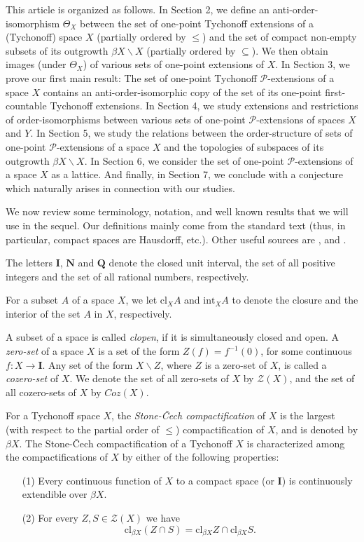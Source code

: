 \documentclass{amsart}
\theoremstyle{definition}
\theoremstyle{remark}
\theoremstyle{notation}
\numberwithin{equation}{section}
\begin{document}
This article is organized as follows. In Section 2, we define an anti-order-isomorphism $\Theta_X$ between the set of  one-point Tychonoff extensions of a (Tychonoff) space $X$ (partially ordered by $\leq$) and the set of compact non-empty subsets of its outgrowth $\beta X\backslash X$ (partially ordered by $\subseteq$). We then obtain images (under  $\Theta_X$) of various sets of one-point  extensions of $X$. In Section 3, we prove our first main  result: The set of one-point Tychonoff ${\mathcal P}$-extensions of a space $X$ contains an anti-order-isomorphic copy  of the set of its one-point first-countable Tychonoff extensions. In  Section 4, we study extensions and restrictions of order-isomorphisms between various sets of one-point ${\mathcal P}$-extensions of spaces $X$ and $Y$. In  Section 5, we study the relations between the order-structure of sets of one-point  ${\mathcal P}$-extensions of a space  $X$ and the topologies of subspaces of its outgrowth $\beta X\backslash X$. In Section 6, we consider the set of one-point  ${\mathcal P}$-extensions of a space $X$ as a lattice. And finally, in  Section 7, we  conclude  with  a conjecture which naturally arises in connection with our studies.

We now review some terminology, notation, and well known results that we will  use in the sequel. Our definitions mainly  come from the standard  text \cite{E} (thus, in particular, compact spaces are Hausdorff,  etc.). Other useful sources are \cite{GJ}, \cite{PW} and \cite{W}.

The letters $\mathbf{I}$,  $\mathbf{N}$ and $\mathbf{Q}$ denote the closed unit interval,  the set of all positive integers and the set of all rational numbers, respectively.

For a subset $A$ of a space $X$, we let $\mbox{cl}_X A$ and $\mbox{int}_X A$ to denote the closure and the interior  of the set $A$ in $X$, respectively.

A subset of a space is called {\em clopen}, if it is simultaneously closed and open.
A {\em zero-set} of a space $X$ is a set of the form
$Z(f)=f^{-1}(0)$, for some continuous $f:X\rightarrow \mathbf{I}$.  Any set of the form
$X\backslash Z$, where $Z$ is a zero-set of $X$, is called a {\em
cozero-set} of $X$. We denote the set of all zero-sets of $X$ by
${\mathscr Z}(X)$, and the set of all cozero-sets of $X$ by $Coz(X)$.

For a Tychonoff space $X$, the
{\em Stone-\v{C}ech compactification} of $X$ is the largest (with respect to the partial order of $\leq$)
compactification of $X$, and is  denoted by $\beta X$.  The Stone-\v{C}ech compactification of a Tychonoff $X$ is characterized
among the compactifications of $X$ by either of the following properties:
\begin{itemize}
\item[\rm(1)] Every continuous function of $X$ to a compact space (or $\mathbf{I}$) is continuously extendible over $\beta X$.
\item[\rm(2)] For every $Z,S\in {\mathscr Z}(X)$ we have
\[\mbox{cl}_{\beta X}(Z\cap S)=\mbox{cl}_{\beta X}Z\cap\mbox{cl}_{\beta X}S.\]
\end{itemize}
\end{document}
